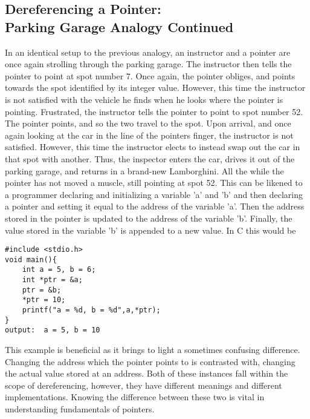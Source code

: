 \documentclass[two column, 10pt]{article}
\begin{document}
\subsection{Dereferencing a Pointer: \\Parking Garage Analogy Continued}
In an identical setup to the previous analogy, an instructor and a pointer are once again strolling through the parking garage. The instructor then tells the pointer to point at spot number 7. Once again, the pointer obliges, and points towards the spot identified by its integer value. However, this time the instructor is not satisfied with the vehicle he finds when he looks where the pointer is pointing. Frustrated, the instructor tells the pointer to point to spot number 52. The pointer points, and so the two travel to the spot. Upon arrival, and once again looking at the car in the line of the pointers finger, the instructor is not satisfied. However, this time the instructor elects to instead swap out the car in that spot with another. Thus, the inspector enters the car, drives it out of the parking garage, and returns in a brand-new Lamborghini. All the while the pointer has not moved a muscle, still pointing at spot 52. 
This can be likened to a programmer declaring and initializing a variable 'a' and 'b' and then declaring a pointer and setting it equal to the address of the variable 'a'. Then the address stored in the pointer is updated to the address of the variable 'b'. Finally, the value stored in the variable 'b' is appended to a new value. In C this would be \begin{lstlisting}[style=CStyle,
caption={Dereferencing a Pointer Twice},captionpos=b]
#include <stdio.h>
void main(){
    int a = 5, b = 6;
    int *ptr = &a;
    ptr = &b;
    *ptr = 10;
    printf("a = %d, b = %d",a,*ptr);
}
output:  a = 5, b = 10
\end{lstlisting}
This example is beneficial as it brings to light a sometimes confusing difference. Changing the address which the pointer points to is contrasted with, changing the actual value stored at an address. Both of these instances fall within the scope of dereferencing, however, they have different meanings and different implementations. Knowing the difference between these two is vital in understanding fundamentals of pointers.
\end{document}
